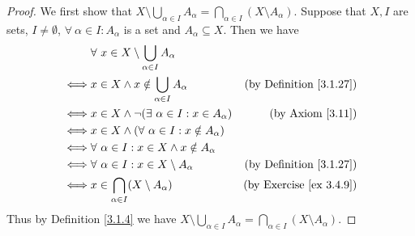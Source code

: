 \begin{proof}
    We first show that \(X \setminus \bigcup_{\alpha \in I} A_{\alpha} = \bigcap_{\alpha \in I} (X \setminus A_{\alpha})\).
    Suppose that \(X, I\) are sets, \(I \neq \emptyset\), \(\forall\ \alpha \in I : A_{\alpha}\) is a set and \(A_{\alpha} \subseteq X\).
    Then we have
    \begin{align*}
             & \forall\ x \in X \setminus \bigcup_{\alpha \in I} A_{\alpha}                                        \\
        \iff & x \in X \land x \notin \bigcup_{\alpha \in I} A_{\alpha}      & \text{(by Definition \ref{3.1.27})} \\
        \iff & x \in X \land \lnot(\exists\ \alpha \in I : x \in A_{\alpha}) & \text{(by Axiom \ref{3.11})}        \\
        \iff & x \in X \land (\forall\ \alpha \in I : x \notin A_{\alpha})                                         \\
        \iff & \forall\ \alpha \in I : x \in X \land x \notin A_{\alpha}                                           \\
        \iff & \forall\ \alpha \in I : x \in X \setminus A_{\alpha}          & \text{(by Definition \ref{3.1.27})} \\
        \iff & x \in \bigcap_{\alpha \in I} (X \setminus A_{\alpha})         & \text{(by Exercise \ref{ex 3.4.9})} \\
    \end{align*}
    Thus by Definition \ref{3.1.4} we have \(X \setminus \bigcup_{\alpha \in I} A_{\alpha} = \bigcap_{\alpha \in I} (X \setminus A_{\alpha})\).


\end{proof}
